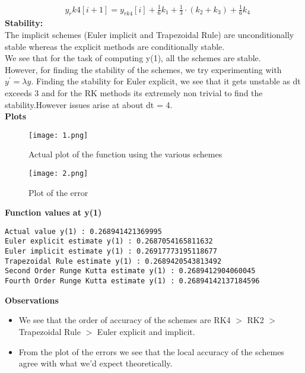 \documentclass[letterpaper]{exam}
\begin{document}
\begin{questions}
\begin{solution}
\begin{align}
    &y_rk4[i+1] = y_{rk4}[i] + \frac{1}{6}k_1 + \frac{1}{3}\cdot(k_2+k_3)+\frac{1}{6}k_4
\end{align}
\textbf{Stability:}\\
The implicit schemes (Euler implicit and Trapezoidal Rule) are unconditionally stable whereas the explicit methods are conditionally stable.\\
We see that for the task of computing y(1), all the schemes are stable.\\
However, for finding the stability of the schemes, we try experimenting with $y^{'} = \lambda y$. Finding the stability for Euler explicit, we see that it gets unstable as dt exceeds 3 and for the RK methods its extremely non trivial to find the stability.However issues arise at about dt = 4.\\
\textbf{Plots}\\
\begin{figure}[H]  
     \centering
    \texttt{[image: 1.png]}
     \label{fig:Dendrogram for the problem 3(c)}
     \caption{Actual plot of the function using the various schemes}
\end{figure}
\begin{figure}[H]  
     \centering
    \texttt{[image: 2.png]}
     \label{fig:Dendrogram for the problem 3(c)}
     \caption{Plot of the error}
\end{figure}
\textbf{Function values at y(1)}
\begin{verbatim}
Actual value y(1) : 0.268941421369995
Euler explicit estimate y(1) : 0.2687054165811632
Euler implicit estimate y(1) : 0.26917773195118677
Trapezoidal Rule estimate y(1) : 0.2689420543813492
Second Order Runge Kutta estimate y(1) : 0.2689412904060045
Fourth Order Runge Kutta estimate y(1) : 0.26894142137184596
\end{verbatim}
\textbf{Observations}
\begin{itemize}
    \item We see that the order of accuracy of the schemes are RK4 $>$ RK2 $>$ Trapezoidal Rule $>$ Euler explicit and implicit.
    \item From the plot of the errors we see that the local accuracy of the schemes agree with what we'd expect theoretically.

\end{itemize}
\end{solution}
\end{questions}
\end{document}
